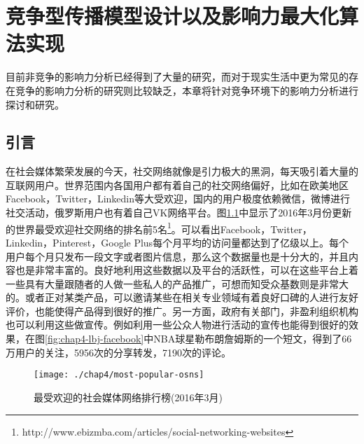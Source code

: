 

\chapter{竞争型传播模型设计以及影响力最大化算法实现}
\label{cha:4thChap04}
目前非竞争的影响力分析已经得到了大量的研究，而对于现实生活中更为常见的存在竞争的影响力分析的研究则比较缺乏，本章将针对竞争环境下的影响力分析进行探讨和研究。

\section{引言}

在社会媒体繁荣发展的今天，社交网络就像是引力极大的黑洞，每天吸引着大量的互联网用户。世界范围内各国用户都有着自己的社交网络偏好，比如在欧美地区Facebook，Twitter，Linkedin等大受欢迎，国内的用户极度依赖微信，微博进行社交活动，俄罗斯用户也有着自己VK网络平台。图\ref{fig:chap4-most-pop-osns}中显示了2016年3月份更新的世界最受欢迎社交网络的排名前5名\footnote{http://www.ebizmba.com/articles/social-networking-websites}。可以看出Facebook，Twitter，Linkedin，Pinterest，Google Plus每个月平均的访问量都达到了亿级以上。每个用户每个月只发布一段文字或者图片信息，那么这个数据量也是十分大的，并且内容也是非常丰富的。良好地利用这些数据以及平台的活跃性，可以在这些平台上着一些具有大量跟随者的人做一些私人的产品推广，可想而知受众基数则是非常大的。或者正对某类产品，可以邀请某些在相关专业领域有着良好口碑的人进行友好评价，也能使得产品得到很好的推广。另一方面，政府有关部门，非盈利组织机构也可以利用这些做宣传。例如利用一些公众人物进行活动的宣传也能得到很好的效果，在图\ref{fig:chap4-lbj-facebook}中NBA球星勒布朗詹姆斯的一个短文，得到了66万用户的关注，5956次的分享转发，7190次的评论。

\begin{figure}[H]
	\centering
	\texttt{[image: ./chap4/most-popular-osns]}
	\caption{最受欢迎的社会媒体网络排行榜(2016年3月)}
	\label{fig:chap4-most-pop-osns}
\end{figure}


